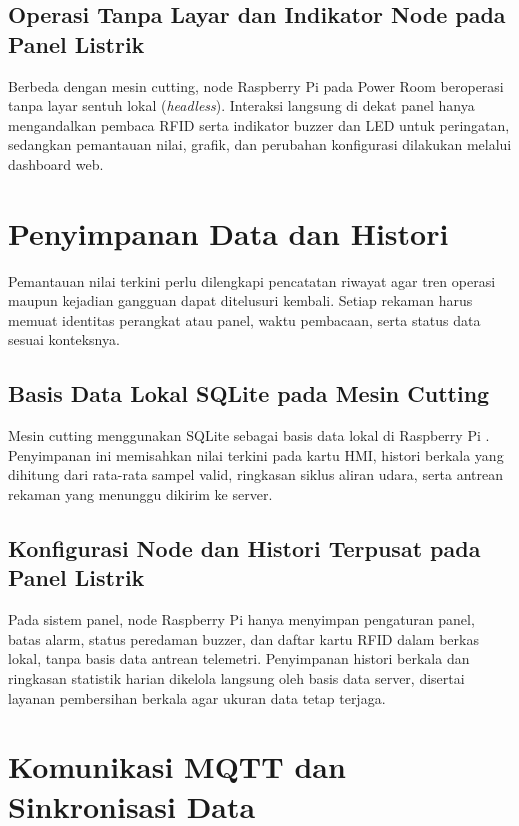 \subsection{Operasi Tanpa Layar dan Indikator Node pada Panel Listrik}

Berbeda dengan mesin cutting, node Raspberry Pi pada Power Room beroperasi tanpa layar sentuh lokal (\textit{headless}). Interaksi langsung di dekat panel hanya mengandalkan pembaca RFID serta indikator buzzer dan LED untuk peringatan, sedangkan pemantauan nilai, grafik, dan perubahan konfigurasi dilakukan melalui dashboard web.

\section{Penyimpanan Data dan Histori}

Pemantauan nilai terkini perlu dilengkapi pencatatan riwayat agar tren operasi maupun kejadian gangguan dapat ditelusuri kembali. Setiap rekaman harus memuat identitas perangkat atau panel, waktu pembacaan, serta status data sesuai konteksnya.

\subsection{Basis Data Lokal SQLite pada Mesin Cutting}

Mesin cutting menggunakan SQLite sebagai basis data lokal di Raspberry Pi \citep{sqlite}. Penyimpanan ini memisahkan nilai terkini pada kartu HMI, histori berkala yang dihitung dari rata-rata sampel valid, ringkasan siklus aliran udara, serta antrean rekaman yang menunggu dikirim ke server.

\subsection{Konfigurasi Node dan Histori Terpusat pada Panel Listrik}

Pada sistem panel, node Raspberry Pi hanya menyimpan pengaturan panel, batas alarm, status peredaman buzzer, dan daftar kartu RFID dalam berkas lokal, tanpa basis data antrean telemetri. Penyimpanan histori berkala dan ringkasan statistik harian dikelola langsung oleh basis data server, disertai layanan pembersihan berkala agar ukuran data tetap terjaga.

\section{Komunikasi MQTT dan Sinkronisasi Data}

